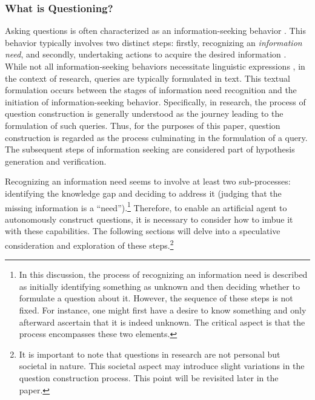 
\subsubsection{What is Questioning?}
Asking questions is often characterized as an information-seeking behavior \cite{watson_2021,taylor1962process}. This behavior typically involves two distinct steps: firstly, recognizing an \textit{information need}, and secondly, undertaking actions to acquire the desired information \cite{wilson1997information,case2016looking}. While not all information-seeking behaviors necessitate linguistic expressions \cite{watson_2021}, in the context of research, queries are typically formulated in text. This textual formulation occurs between the stages of information need recognition and the initiation of information-seeking behavior. Specifically, in research, the process of question construction is generally understood as the journey leading to the formulation of such queries. Thus, for the purposes of this paper, question construction is regarded as the process culminating in the formulation of a query. The subsequent steps of information seeking are considered part of hypothesis generation and verification.

Recognizing an information need seems to involve at least two sub-processes: identifying the knowledge gap and deciding to address it (judging that the missing information is a ``need'').\footnote{
In this discussion, the process of recognizing an information need is described as initially identifying something as unknown and then deciding whether to formulate a question about it. However, the sequence of these steps is not fixed. For instance, one might first have a desire to know something and only afterward ascertain that it is indeed unknown. The critical aspect is that the process encompasses these two elements.
} Therefore, to enable an artificial agent to autonomously construct questions, it is necessary to consider how to imbue it with these capabilities. The following sections will delve into a speculative consideration and exploration of these steps.\footnote{
It is important to note that questions in research are not personal but societal in nature. This societal aspect may introduce slight variations in the question construction process. This point will be revisited later in the paper.
}



